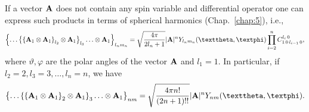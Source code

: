 If a vector $\mathbf{A}$ does not contain any spin variable and differential operator one can express such products in terms of spherical harmonics (Chap.~\ref{chap:5}), i.e.,
\begin{equation}
\left\{\ldots\left\{\left\{\vect{A}_{1} \otimes \vect{A}_{1}\right\}_{l_{2}} \otimes \vect{A}_{1}\right\}_{l_{3}} \ldots \otimes \vect{A}_{1}\right\}_{l_{n} m_{n}}=\sqrt{\frac{4 \pi}{2 l_{n}+1}}|\vect{A}|^{n} Y_{l_{n} m_{n}}(\vartheta, \varphi) \prod_{i=2}^{n} \clebsch{1}{0}{l_{i-1}}{0}{l_{i}}{0} ,\label{eq:3:2:22}
\end{equation}
where $\vartheta, \varphi$ are the polar angles of the vector $\mathbf{A}$ and $l_{1}=1$. In particular, if $l_{2}=2, l_{3}=3, \ldots, l_{n}=n$, we have
\begin{equation}
\left\{\ldots\left\{\left\{\vect{A}_{1} \otimes \vect{A}_{1}\right\}_{2} \otimes \vect{A}_{1}\right\}_{3} \ldots \otimes \vect{A}_{1}\right\}_{n m}=\sqrt{\frac{4 \pi n!}{(2 n+1)!!}}|\vect{A}|^{n} Y_{n m}(\vartheta, \varphi) .\label{eq:3:2:23}
\end{equation}

